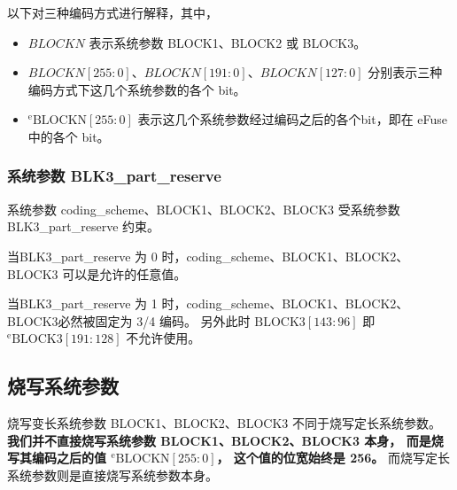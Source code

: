 \documentclass[main\_\_CN.tex]{subfiles}
\begin{document}
以下对三种编码方式进行解释，其中，
\begin{itemize}
\item \begin{math}BLOCKN\end{math} 表示系统参数 BLOCK1、BLOCK2 或 BLOCK3。
\item \begin{math}BLOCKN[255:0]\end{math}、\begin{math}BLOCKN[191:0]\end{math}、\begin{math}BLOCKN[127:0]\end{math} 分别表示三种编码方式下这几个系统参数的各个 bit。
\item  \begin{math}{}^{\mathrm{e}}\mathrm{BLOCKN}[255\!:\!0]\end{math} 表示这几个系统参数经过编码之后的各个bit，即在 eFuse 中的各个 bit。
\end{itemize}




\hypertarget{BLK3_part_reserve}{\subsubsection{系统参数 BLK3\_part\_reserve}}\label{BLK3}

系统参数 coding\_scheme、BLOCK1、BLOCK2、BLOCK3
受系统参数 BLK3\_part\_reserve 约束。

当BLK3\_part\_reserve 为 0 时，coding\_scheme、BLOCK1、BLOCK2、BLOCK3 可以是允许的任意值。

当BLK3\_part\_reserve 为 1 时，coding\_scheme、BLOCK1、BLOCK2、BLOCK3必然被固定为 3/4 编码。
另外此时
\begin{math}\mathrm{BLOCK3}[143\!:\!96]\end{math}
即
$^{\mathrm{e}}\mathrm{BLOCK3}[191\!:\!128]$
不允许使用。

\subsection{烧写系统参数}

\hypertarget{program_BLOCKN}{}
烧写变长系统参数 BLOCK1、BLOCK2、BLOCK3 不同于烧写定长系统参数。
\textbf{我们并不直接烧写系统参数 BLOCK1、BLOCK2、BLOCK3 本身，
而是烧写其编码之后的值 \begin{math}{}^{\mathrm{e}}\mathrm{BLOCKN}[255\!:\!0]\end{math}，
这个值的位宽始终是 256。}
而烧写定长系统参数则是直接烧写系统参数本身。
\end{document}
